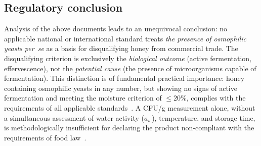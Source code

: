 \subsection{Regulatory conclusion}

Analysis of the above documents leads to an unequivocal conclusion:
no applicable national or international standard treats \emph{the
presence of osmophilic yeasts per~se} as a basis for disqualifying
honey from commercial trade. The disqualifying criterion is exclusively
the \emph{biological outcome} (active fermentation, effervescence),
not the \emph{potential cause} (the presence of microorganisms capable
of fermentation). This distinction is of fundamental practical
importance: honey containing osmophilic yeasts in any number, but
showing no signs of active fermentation and meeting the moisture
criterion of $\leq 20\%$, complies with the requirements of all
applicable standards~\cite{codex_stan12,eudir2001110}.
A CFU/g measurement alone, without a simultaneous assessment of water
activity ($a_w$), temperature, and storage time, is methodologically
insufficient for declaring the product non-compliant with the
requirements of food law~\cite{tsagkaris2021,schoder2026}.
